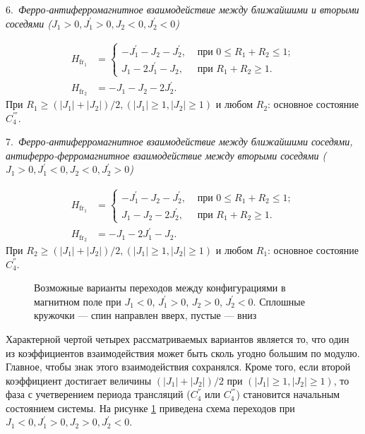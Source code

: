 6.~\emph{Ферро-антиферромагнитное взаимодействие между ближайшими и вторыми соседями ($J_1>0, J_{1}^{'}>0, J_{2}<0, J_{2}^{'}<0$)}

\[
\begin{aligned}
H_{\text{fr}_1}&=
\begin{cases}
-J_1^{'}-J_2-J_2^{'}, & \text{ при } 0\leq R_1+R_2\leq 1 ; \\
J_1-2J_1^{'}-J_2,   & \text{ при }  R_1+R_2\ge 1.
\end{cases}\\
H_{\text{fr}_2}&= -J_1-J_2-2J_2^{'}.
\end{aligned}
\]
При $R_1\ge (|J_1|+|J_2|)/2, (|J_1|\ge 1, |J_2|\ge 1)$ и любом $R_2$: основное состояние $C_4^{'''}$.

7.~\emph{Ферро-антиферромагнитное взаимодействие между ближайшими соседями, антиферро-ферромагнитное взаимодействие между вторыми соседями ($J_1>0, J_{1}^{'}<0, J_{2}<0, J_{2}^{'}>0$) }

\[
\begin{aligned}
H_{\text{fr}_1}&=
\begin{cases}
-J_1^{'}-J_2-J_2^{'}, & \text{ при } 0\leq R_1+R_2\leq 1 ; \\
J_1-J_2-2J_2^{'},   & \text{ при }  R_1+R_2\ge 1.
\end{cases}\\
H_{\text{fr}_2}&= -J_1-2J_1^{'}-J_2.
\end{aligned}
\]
При $R_2\ge (|J_1|+|J_2|)/2, (|J_1|\ge 1, |J_2|\ge 1)$ и любом $R_1$: основное состояние $C_4^{''}$.

 \begin{figure}[h]
 	\caption{Возможные варианты переходов между конфигурациями в магнитном поле при $J_1 < 0$, $J_1^{'} > 0$, $J_2 > 0$, $J_2^{'} < 0$. Сплошные кружочки --- спин направлен вверх, пустые --- вниз}
 	\label{transGenChain3}
 \end{figure}

Характерной чертой четырех рассматриваемых вариантов является то, что один из коэффициентов взаимодействия может быть сколь угодно большим по модулю. Главное, чтобы знак этого взаимодействия сохранялся. Кроме того, если второй коэффициент достигает величины $(|J_1| + |J_2|)/2$ при $(|J_1| \ge 1, |J_2| \ge 1)$, то фаза с учетверением периода трансляций ($C_4^{''}$ или
$C_4^{'''}$) становится начальным состоянием системы.  На рисунке \ref{transGenChain3} приведена схема переходов при $J_1 < 0, J_1^{'} > 0, J_2 > 0, J_2^{'} < 0$.

